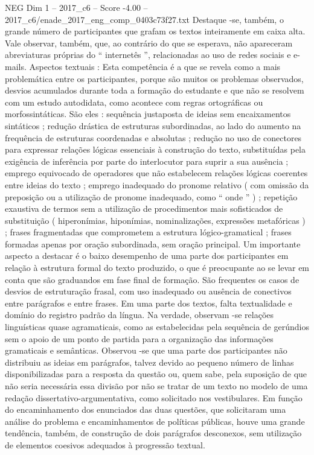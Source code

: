 \begin{textsample}{NEG Dim 1 – 2017\_c6 – Score -4.00 – 2017\_c6/enade\_2017\_eng\_comp\_0403c73f27.txt}
Destaque -se, também, o grande número de participantes que grafam os textos inteiramente em caixa alta.
Vale observar, também, que, ao contrário do que se esperava, não apareceram abreviaturas próprias do “ internetês ”, relacionadas ao uso de redes sociais e e-mails.
Aspectos textuais : Esta competência é a que se revela como a mais problemática entre os participantes, porque são muitos os problemas observados, desvios acumulados durante toda a formação do estudante e que não se resolvem com um estudo autodidata, como acontece com regras ortográficas ou morfossintáticas.
São eles : sequência justaposta de ideias sem encaixamentos sintáticos ; redução drástica de estruturas subordinadas, ao lado do aumento na frequência de estruturas coordenadas e absolutas ; redução no uso de conectores para expressar relações lógicas essenciais à construção do texto, substituídas pela exigência de inferência por parte do interlocutor para suprir a sua ausência ; emprego equivocado de operadores que não estabelecem relações lógicas coerentes entre ideias do texto ; emprego inadequado do pronome relativo ( com omissão da preposição ou a utilização de pronome inadequado, como “ onde ” ) ; repetição exaustiva de termos sem a utilização de procedimentos mais sofisticados de substituição ( hiperonímias, hiponímias, nominalizações, expressões metafóricas ) ; frases fragmentadas que comprometem a estrutura lógico-gramatical ; frases formadas apenas por oração subordinada, sem oração principal.
Um importante aspecto a destacar é o baixo desempenho de uma parte dos participantes em relação à estrutura formal do texto produzido, o que é preocupante ao se levar em conta que são graduandos em fase final de formação.
São frequentes os casos de desvios de estruturação frasal, com uso inadequado ou ausência de conectivos entre parágrafos e entre frases.
Em uma parte dos textos, falta textualidade e domínio do registro padrão da língua.
Na verdade, observam -se relações linguísticas quase agramaticais, como as estabelecidas pela sequência de gerúndios sem o apoio de um ponto de partida para a organização das informações gramaticais e semânticas.
Observou -se que uma parte dos participantes não distribuiu as ideias em parágrafos, talvez devido ao pequeno número de linhas disponibilizadas para a resposta da questão ou, quem sabe, pela suposição de que não seria necessária essa divisão por não se tratar de um texto no modelo de uma redação dissertativo-argumentativa, como solicitado nos vestibulares.
Em função do encaminhamento dos enunciados das duas questões, que solicitaram uma análise do problema e encaminhamentos de políticas públicas, houve uma grande tendência, também, de construção de dois parágrafos desconexos, sem utilização de elementos coesivos adequados à progressão textual.

\end{textsample}
